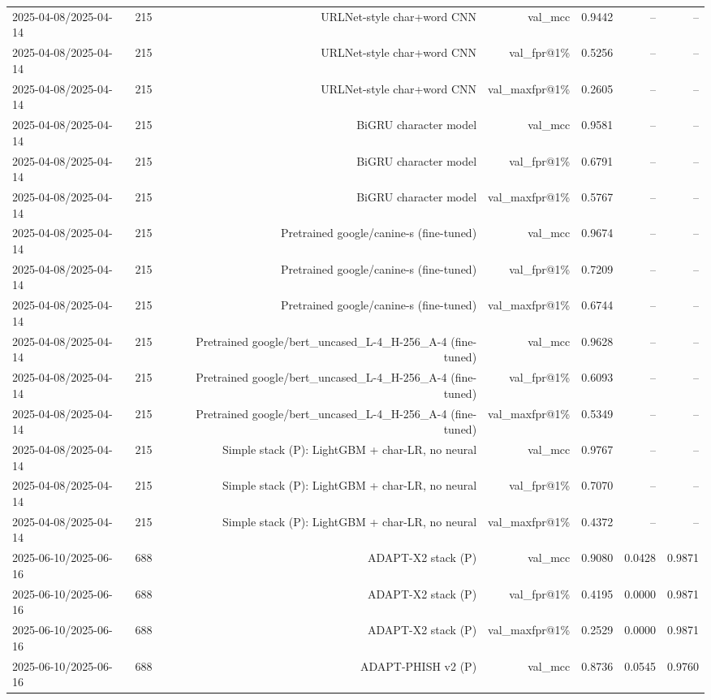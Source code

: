 \begin{table}[t]
\begin{tabular}{llrrrrr}
2025-04-08/2025-04-14 & 215 & URLNet-style char+word CNN & val\_mcc & 0.9442 & -- & -- \\
2025-04-08/2025-04-14 & 215 & URLNet-style char+word CNN & val\_fpr@1\% & 0.5256 & -- & -- \\
2025-04-08/2025-04-14 & 215 & URLNet-style char+word CNN & val\_maxfpr@1\% & 0.2605 & -- & -- \\
2025-04-08/2025-04-14 & 215 & BiGRU character model & val\_mcc & 0.9581 & -- & -- \\
2025-04-08/2025-04-14 & 215 & BiGRU character model & val\_fpr@1\% & 0.6791 & -- & -- \\
2025-04-08/2025-04-14 & 215 & BiGRU character model & val\_maxfpr@1\% & 0.5767 & -- & -- \\
2025-04-08/2025-04-14 & 215 & Pretrained google/canine-s (fine-tuned) & val\_mcc & 0.9674 & -- & -- \\
2025-04-08/2025-04-14 & 215 & Pretrained google/canine-s (fine-tuned) & val\_fpr@1\% & 0.7209 & -- & -- \\
2025-04-08/2025-04-14 & 215 & Pretrained google/canine-s (fine-tuned) & val\_maxfpr@1\% & 0.6744 & -- & -- \\
2025-04-08/2025-04-14 & 215 & Pretrained google/bert\_uncased\_L-4\_H-256\_A-4 (fine-tuned) & val\_mcc & 0.9628 & -- & -- \\
2025-04-08/2025-04-14 & 215 & Pretrained google/bert\_uncased\_L-4\_H-256\_A-4 (fine-tuned) & val\_fpr@1\% & 0.6093 & -- & -- \\
2025-04-08/2025-04-14 & 215 & Pretrained google/bert\_uncased\_L-4\_H-256\_A-4 (fine-tuned) & val\_maxfpr@1\% & 0.5349 & -- & -- \\
2025-04-08/2025-04-14 & 215 & Simple stack (P): LightGBM + char-LR, no neural & val\_mcc & 0.9767 & -- & -- \\
2025-04-08/2025-04-14 & 215 & Simple stack (P): LightGBM + char-LR, no neural & val\_fpr@1\% & 0.7070 & -- & -- \\
2025-04-08/2025-04-14 & 215 & Simple stack (P): LightGBM + char-LR, no neural & val\_maxfpr@1\% & 0.4372 & -- & -- \\
2025-06-10/2025-06-16 & 688 & ADAPT-X2 stack (P) & val\_mcc & 0.9080 & 0.0428 & 0.9871 \\
2025-06-10/2025-06-16 & 688 & ADAPT-X2 stack (P) & val\_fpr@1\% & 0.4195 & 0.0000 & 0.9871 \\
2025-06-10/2025-06-16 & 688 & ADAPT-X2 stack (P) & val\_maxfpr@1\% & 0.2529 & 0.0000 & 0.9871 \\
2025-06-10/2025-06-16 & 688 & ADAPT-PHISH v2 (P) & val\_mcc & 0.8736 & 0.0545 & 0.9760 \\

\end{tabular}
\end{table}
